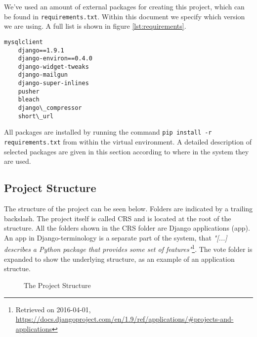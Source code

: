 We've used an amount of external packages for creating this project, which can be found in \texttt{requirements.txt}. Within this document we specify which version we are using. A full list is shown in figure \ref{lst:requirements}.

\begin{lstlisting}[caption=The requirements.txt file. A omitted version number means the newest one is used., label=lst:requirements]
    mysqlclient
    django==1.9.1
    django-environ==0.4.0
    django-widget-tweaks
    django-mailgun
    django-super-inlines
    pusher
    bleach
    django\_compressor
    short\_url
\end{lstlisting}

All packages are installed by running the command \texttt{pip install -r requirements.txt} from within the virtual environment. A detailed description of selected packages are given in this section according to where in the system they are used.

\subsection{Project Structure}
The structure of the project can be seen below. Folders are indicated by a trailing backslash. The project itself is called CRS and is located at the root of the structure. All the folders shown in the CRS folder are Django applications (app). An app in Django-terminology is a separate part of the system, that \emph{"[...] describes a Python package that provides some set of features"}\footnote{Retrieved on 2016-04-01, \url{https://docs.djangoproject.com/en/1.9/ref/applications/\#projects-and-applications}}. The vote folder is expanded to show the underlying structure, as an example of an application structue.

\begin{figure}[H]
    \caption{The Project Structure}
    \label{fig:project-structure}
\end{figure}

